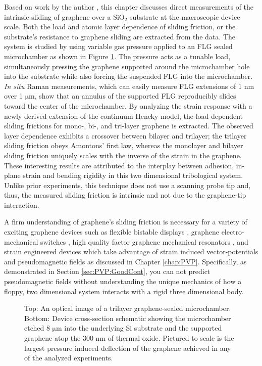 Based on work by the author \cite{Kitt2013a}, this chapter discusses direct measurements of the intrinsic sliding of graphene over a $\mathrm{SiO_2}$ substrate at the macroscopic device scale.
Both the load and atomic layer dependence of sliding friction, or the substrate's resistance to graphene sliding are extracted from the data.
The system is studied by using variable gas pressure applied to an FLG sealed microchamber as shown in Figure \ref{fig:fri:device}.
The pressure acts as a tunable load, simultaneously pressing the graphene supported around the microchamber hole into the substrate while also forcing the suspended FLG into the microchamber.
\emph{In situ} Raman measurements, which can easily measure FLG extensions of 1 nm over 1 $\mathrm{\mu}$m, show that an annulus of the supported FLG reproducibly slides toward the center of the microchamber.
By analyzing the strain response with a newly derived extension of the continuum Hencky model, the load-dependent sliding frictions for mono-, bi-, and tri-layer graphene is extracted.
The observed layer dependence exhibits a crossover between bilayer and trilayer; the trilayer sliding friction obeys Amontons' first law, whereas the monolayer and bilayer sliding friction uniquely scales with the inverse of the strain in the graphene.
These interesting results are attributed to the interplay between adhesion, in-plane strain and bending rigidity in this two dimensional tribological system.
Unlike prior experiments, this technique does not use a scanning probe tip and, thus, the measured sliding friction is intrinsic and not due to the graphene-tip interaction.

A firm understanding of graphene's sliding friction is necessary for a variety of exciting graphene devices such as flexible bistable displays \cite{Bonaccorso2010}, graphene electro-mechanical switches \cite{Milaninia2009}, high quality factor graphene mechanical resonators \cite{Kim2009b,Bunch2007,Chen2009,Barton2011}, and strain engineered devices \cite{Pereira2009a} which take advantage of strain induced vector-potentials and pseudomagnetic fields \cite{CastroNeto2009,Guinea2009,Kitt2012,Kitt2013} as discussed in Chapter \ref{chap:PVP}.
Specifically, as demonstrated in Section \ref{sec:PVP:GoodCont}, you can not predict pseudomagnetic fields without understanding the unique mechanics of how a floppy, two dimensional system interacts with a rigid three dimensional body.

\begin{figure}
	\begin{center}
	
	\end{center}
	\caption[Schematic of devices used to measure graphene's macroscopic friction]{\label{fig:fri:device} Top: An optical image of a trilayer graphene-sealed microchamber. Bottom: Device cross-section schematic showing the microchamber etched 8 $\mathrm{\mu}$m into the underlying Si substrate and the supported graphene atop the 300 nm of thermal oxide.  Pictured to scale is the largest pressure induced deflection of the graphene achieved in any of the analyzed experiments.}
\end{figure}

